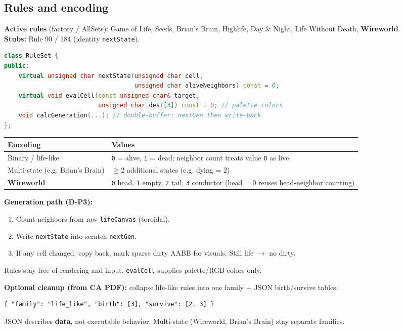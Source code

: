 \documentclass[10pt,a4paper]{article}
\begin{document}
\subsection{Rules and encoding}
\textbf{Active rules} (factory / AllSets): Game of Life, Seeds, Brian's Brain, Highlife, Day \& Night, Life Without Death, \textbf{Wireworld}.\\
\textbf{Stubs:} Rule 90 / 184 (identity \texttt{nextState}).

\begin{lstlisting}[language=C++]
class RuleSet {
public:
    virtual unsigned char nextState(unsigned char cell,
                                    unsigned char aliveNeighbors) const = 0;
    virtual void evalCell(const unsigned char& target,
                          unsigned char dest[3]) const = 0; // palette colors
    void calcGeneration(...); // double-buffer: nextGen then write-back
};
\end{lstlisting}

\begin{table}[h!]
\centering
\small
\begin{tabularx}{\textwidth}{l X}
\toprule
\textbf{Encoding} & \textbf{Values} \\
\midrule
Binary / life-like & \texttt{0} = alive, \texttt{1} = dead; neighbor count treats value \texttt{0} as live \\
Multi-state (e.g. Brian's Brain) & $\ge 2$ additional states (e.g. dying = 2) \\
\textbf{Wireworld} & \texttt{0} head, \texttt{1} empty, \texttt{2} tail, \texttt{3} conductor (head = 0 reuses head-neighbor counting) \\
\bottomrule
\end{tabularx}
\end{table}

\noindent \textbf{Generation path (D-P3):}
\begin{enumerate}
    \item Count neighbors from raw \texttt{lifeCanvas} (toroidal).
    \item Write \texttt{nextState} into scratch \texttt{nextGen}.
    \item If any cell changed: copy back, mark sparse dirty AABB for visuals. Still life $\rightarrow$ no dirty.
\end{enumerate}

\noindent Rules stay free of rendering and input. \texttt{evalCell} supplies palette/RGB colors only.

\noindent \textbf{Optional cleanup (from CA PDF):} collapse life-like rules into one family + JSON birth/survive tables:
\begin{lstlisting}
{ "family": "life_like", "birth": [3], "survive": [2, 3] }
\end{lstlisting}
JSON describes \textbf{data}, not executable behavior. Multi-state (Wireworld, Brian's Brain) stay separate families.
\end{document}
